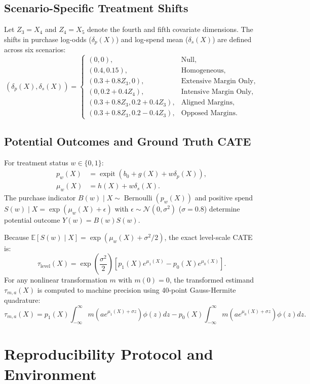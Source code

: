 \documentclass[conference]{IEEEtran}
\newcommand{\taulevel}{\tau_{\text{level}}}
\newcommand{\tauma}{\tau_{m, a}}
\newcommand{\E}{\mathbb{E}}
\begin{document}
\subsection{Scenario-Specific Treatment Shifts}
Let $Z_3 = X_4$ and $Z_4 = X_5$ denote the fourth and fifth covariate dimensions. The shifts in purchase log-odds ($\delta_p(X)$) and log-spend mean ($\delta_s(X)$) are defined across six scenarios:
\begin{equation}
(\delta_p(X), \delta_s(X)) = \begin{cases}
(0, 0), & \text{Null}, \\
(0.4, 0.15), & \text{Homogeneous}, \\
(0.3 + 0.8 Z_3, 0), & \text{Extensive Margin Only}, \\
(0, 0.2 + 0.4 Z_4), & \text{Intensive Margin Only}, \\
(0.3 + 0.8 Z_3, 0.2 + 0.4 Z_3), & \text{Aligned Margins}, \\
(0.3 + 0.8 Z_3, 0.2 - 0.4 Z_3), & \text{Opposed Margins}.
\end{cases}
\end{equation}

\subsection{Potential Outcomes and Ground Truth CATE}
For treatment status $w \in \{0, 1\}$:
\begin{align}
p_w(X) &= \operatorname{expit}(b_0 + g(X) + w \delta_p(X)), \\
\mu_w(X) &= h(X) + w \delta_s(X).
\end{align}
The purchase indicator $B(w) \mid X \sim \operatorname{Bernoulli}(p_w(X))$ and positive spend $S(w) \mid X = \exp(\mu_w(X) + \epsilon)$ with $\epsilon \sim \mathcal{N}(0, \sigma^2)$ ($\sigma=0.8$) determine potential outcome $Y(w) = B(w) S(w)$.

Because $\E[S(w) \mid X] = \exp(\mu_w(X) + \sigma^2/2)$, the exact level-scale CATE is:
\begin{equation}
\boxed{\taulevel(X) = \exp\left(\frac{\sigma^2}{2}\right) \left[ p_1(X) e^{\mu_1(X)} - p_0(X) e^{\mu_0(X)} \right].}
\end{equation}
For any nonlinear transformation $m$ with $m(0)=0$, the transformed estimand $\tauma(X)$ is computed to machine precision using 40-point Gauss-Hermite quadrature:
\begin{equation}
\tauma(X) = p_1(X) \int_{-\infty}^{\infty} m\left(a e^{\mu_1(X) + \sigma z}\right) \phi(z) dz - p_0(X) \int_{-\infty}^{\infty} m\left(a e^{\mu_0(X) + \sigma z}\right) \phi(z) dz.
\end{equation}

\section{Reproducibility Protocol and Environment}
\label{app:repro}



\end{document}
